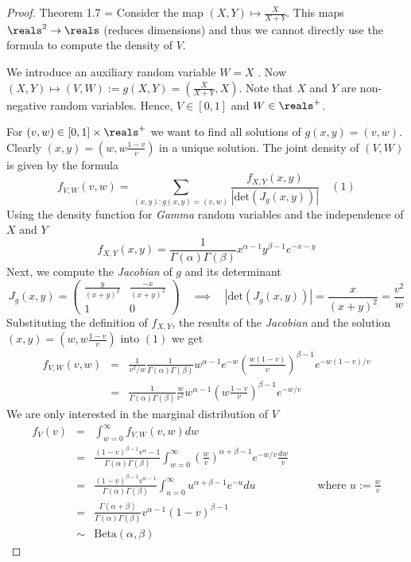 \documentclass[11pt,a4paper]{article}
\begin{document}
\begin{proof}{Theorem 1.7}
  \everymath={\displaystyle}
  Consider the map $(X,Y)\mapsto\frac{X}{X+Y}$. This maps $\reals^2\to\reals$ (reduces dimensions) and thus we cannot directly use the formula to compute the density of $V$.
  \par We introduce an auxiliary random variable $W=X$ . Now $(X,Y)\mapsto(V,W):=g(X,Y)=\left(\frac{X}{X+Y},X\right)$. Note that $X$ and $Y$ are non-negative random variables. Hence, $V\in[0,1]$ and $W\in\reals^+$.
  \par For $(v,w)\in[0,1]\times\reals^+$ we want to find all solutions of $g(x,y)=(v,w)$. Clearly $(x,y)=\left(w,w\frac{1-v}v\right)$ in a unique solution. The joint density of $(V,W)$ is given by the formula
  \[ f_{V,W}(v,w)=\sum_{(x,y):g(x,y)=(v,w)}\frac{f_{X,Y}(x,y)}{|\text{det}(J_g(x,y))|}\quad(1) \]
  Using the density function for \textit{Gamma} random variables and the independence of $X$ and $Y$
  \[ f_{X,Y}(x,y)=\frac1{\Gamma(\alpha)\Gamma(\beta)}x^{\alpha-1}y^{\beta-1}e^{-x-y} \]
  Next, we compute the \textit{Jacobian} of $g$ and its determinant
  \[ J_g(x,y)=\begin{pmatrix}\frac{y}{(x+y)^2}&\frac{-x}{(x+y)^2}\\1&0\end{pmatrix}\quad\implies\quad |\text{det}(J_g(x,y))|=\frac{x}{(x+y)^2}=\frac{v^2}w \]
  Substituting the definition of $f_{X,Y}$, the results of the \textit{Jacobian} and the solution $(x,y)=\left(w,w\frac{1-v}v\right)$ into $(1)$ we get
  \[\begin{array}{rcl}
    f_{V,W}(v,w)&=&\frac{1}{v^2/w}\frac1{\Gamma(\alpha)\Gamma(\beta)}w^{\alpha-1}e^{-w}\left(\frac{w(1-v)}{v}\right)^{\beta-1}e^{-w(1-v)/v}\\
    &=&\frac1{\Gamma(\alpha)\Gamma(\beta)}\frac{w}{v^2}w^{\alpha-1}\left(w\frac{1-v}v\right)^{\beta-1}e^{-w/v}
  \end{array}\]
  We are only interested in the marginal distribution of $V$
  \[\begin{array}{rclcl}
    f_V(v)&=&\int_{w=0}^\infty f_{V,W}(v,w)dw&\quad&\\
    &=&\frac{(1-v)^{\beta-1}v^{\alpha}-1}{\Gamma(\alpha)\Gamma(\beta)}\int_{w=0}^\infty\left(\frac{w}v\right)^{\alpha+\beta-1}e^{-w/v}\frac{dw}v\\
    &=&\frac{(1-v)^{\beta-1}v^{\alpha-1}}{\Gamma(\alpha)\Gamma(\beta)}\int_{u=0}^\infty u^{\alpha+\beta-1}e^{-u}du&&\text{where }u:=\frac{w}v\\
    &=&\frac{\Gamma(\alpha+\beta)}{\Gamma(\alpha)\Gamma(\beta)}v^{\alpha-1}(1-v)^{\beta-1}\\
    &\sim&\text{Beta}(\alpha,\beta)
  \end{array}\]
  \hfill\proved
\end{proof}
\end{document}
